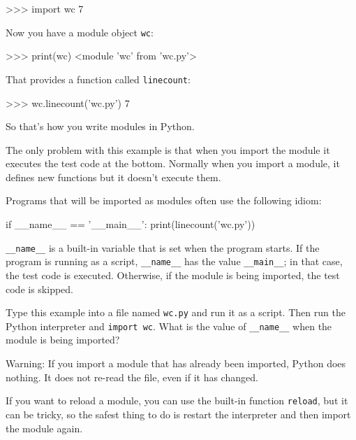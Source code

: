 \beforeverb
\begin{pyinterpreter}
>>> import wc
7
\end{pyinterpreter}
\afterverb
%
Now you have a module object {\tt wc}:


\beforeverb
\begin{pyinterpreter}
>>> print(wc)
<module 'wc' from 'wc.py'>
\end{pyinterpreter}
\afterverb
%
That provides a function called \verb"linecount":

\beforeverb
\begin{pyinterpreter}
>>> wc.linecount('wc.py')
7
\end{pyinterpreter}
\afterverb
%
So that's how you write modules in Python.

The only problem with this example is that when you import
the module it executes the test code at the bottom.  Normally
when you import a module, it defines new functions but it
doesn't execute them.


Programs that will be imported as modules often
use the following idiom:

\beforeverb
\begin{pycode}
if __name__ == '__main__':
    print(linecount('wc.py'))
\end{pycode}
\afterverb
%
\verb"__name__" is a built-in variable that is set when the
program starts.  If the program is running as a script,
\verb"__name__" has the value \verb"__main__"; in that
case, the test code is executed.  Otherwise,
if the module is being imported, the test code is skipped.

\begin{exercise}
Type this example into a file named {\tt wc.py} and run
it as a script.  Then run the Python interpreter and
{\tt import wc}.  What is the value of \verb"__name__"
when the module is being imported?

Warning: If you import a module that has already been imported,
Python does nothing.  It does not re-read the file, even if it has
changed.


If you want to reload a module, you can use the built-in function 
{\tt reload}, but it can be tricky, so the safest thing to do is
restart the interpreter and then import the module again.
\end{exercise}



